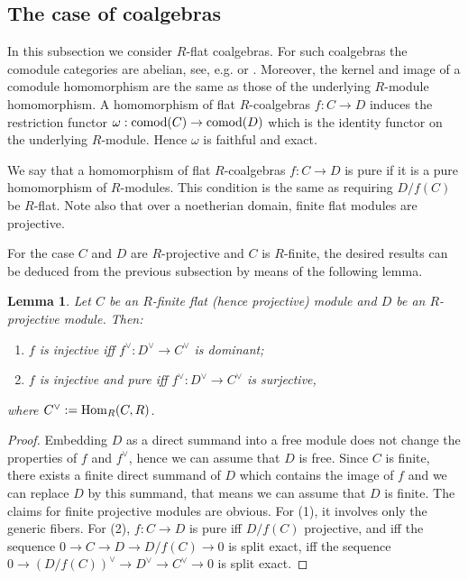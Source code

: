 \documentclass[12pt]{amsart}
\theoremstyle{plain}
\newtheorem{lem}[thm]{Lemma}
\theoremstyle{definition}
\newtheorem{rmk}[thm]{Remark}
\numberwithin{thm}{section}
\def\comod{{\rm comod}}
\begin{document}


\subsection{The case of coalgebras}
In this subsection we consider $R$-flat 
coalgebras. For such coalgebras the comodule 
categories are abelian, see, e.g. \cite[Lem.~3.3.3]{Ha} or \cite[Thm.~3.13]{BW}. Moreover, the kernel and image of a comodule  homomorphism are the same as those of the underlying $R$-module homomorphism. A homomorphism of flat $R$-coalgebras $f:C\to D$ induces the restriction functor $\omega:\comod(C)\to \comod(D)$ which is the identity functor on the underlying $R$-module. Hence $\omega$ is faithful and exact.

We say that a homomorphism of 
flat $R$-coalgebras $f:C\to D$ is pure if it is  a pure homomorphism of 
$R$-modules. This 
condition is the same as requiring $D/f(C)$ be $R$-flat.  Note 
also that over a noetherian domain, finite flat 
modules are projective.

For the case $C$ and $D$ are $R$-projective and $C$ is $R$-finite, the desired results can be deduced from the previous subsection by means of the following lemma.
\begin{lem}\label{lem6} Let $C$ be an $R$-finite 
flat (hence projective) module and $D$ be an 
$R$-projective module. Then:
\begin{enumerate}\item $f$ is injective 
iff $f^\vee:D^\vee\to C^\vee$ is dominant;
\item $f$ is injective and pure iff 
$f^\vee:D^\vee\to C^\vee$ is surjective, 
\end{enumerate}
where $C^\vee:={\rm Hom}_R(C,R)$.
\end{lem}
\begin{proof}
Embedding $D$ as a direct summand into a free 
module does not 
change the properties of $f$ and $f^\vee$, 
hence we can assume that $D$ is free. Since $C$ 
is finite, there exists a finite direct summand of 
$D$ which contains the image of $f$ and we can 
replace $D$ by this summand, that means 
we can assume that $D$ is finite. 
The claims for finite projective modules are obvious. 
For (1), it involves only the generic fibers. For (2),
$f:C\to D$ is pure iff $D/f(C)$ projective,  and iff the 
sequence $0\to C\to D\to D/f(C)\to 0$ is split exact, iff 
the sequence 
$0\to (D/f(C))^\vee\to D^\vee\to C^\vee\to 0$ is split
exact. 
\end{proof}
\end{document}

